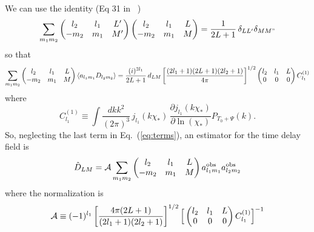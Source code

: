 \documentclass[prd,amsmath,amssymb,floatfix,superscriptaddress,nofootinbib,preprintnumbers]{revtex4-1}
\def\be{\begin{equation}}
\def\ee{\end{equation}}
\newcommand{\ec}[1]{Eq.~(\ref{eq:#1})}
\begin{document}
We can use the identity (Eq 31 in ~\cite{Okamoto:2003zw})
\be
\sum_{m_1m_2} 
 \left(\begin{matrix} l_2 & l_1 &L'\cr -m_2&m_1&M'\end{matrix}\right)
 \left(\begin{matrix} l_2 & l_1 &L\cr -m_2&m_1&M\end{matrix}\right)
=\frac{1}{2L+1}\,\delta_{LL'}\delta_{MM"}
\ee
so that
\be
\sum_{m_1m_2}  \left(\begin{matrix} l_2 & l_1 &L\cr -m_2&m_1&M\end{matrix}\right) \langle a_{l_1m_1}D_{l_2m_2}\rangle
= \frac{(i)^{2l_1}}{2L+1}\,d_{LM} 
 \left[ \frac{(2l_1+1)(2L+1)(2l_2+1)}{4\pi}\right]^{1/2}\left(\begin{matrix} l_2& l_1 &L\cr 0&0&0\end{matrix}\right)
 C^{(1)}_{l_1}
\ee
where
\be
C^{(1)}_{l_1}\equiv \int \frac{dk k^2}{(2\pi)^3}\, j_{l_1}(k\chi_*)\,\frac{\partial j_{l_1}(k\chi_*)}{\partial\ln(\chi_*)}P_{T_0+\Psi}(k).
\ee
So, neglecting the last term in \ec{terms}, an estimator for the time delay field is
\be
\hat D_{LM} = \mathcal{A} \sum_{m_1m_2}  \left(\begin{matrix} l_2 & l_1 &L\cr -m_2&m_1&M\end{matrix}\right)
 a^{\rm obs}_{l_1m_1} a^{\rm obs}_{l_2m_2} \ee
 where the normalization is
 \be
 \mathcal{A} \equiv (-1)^{l_1}
 \left[ \frac{4\pi (2L+1)}{(2l_1+1)(2l_2+1)}\right]^{1/2}
 \Big[
 \left(\begin{matrix} l_2& l_1 &L\cr 0&0&0\end{matrix}\right)
 C^{(1)}_{l_1}
 \Big]^{-1}
 \ee
 

\end{document}
